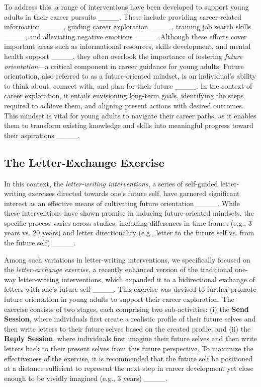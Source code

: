 To address this, a range of interventions have been developed to support young adults in their career pursuits ____. These include providing career-related information ____, guiding career exploration ____, training job search skills ____, and alleviating negative emotions ____. Although these efforts cover important areas such as informational resources, skills development, and mental health support ____, they often overlook the importance of fostering \textit{future orientation}—a critical component in career guidance for young adults. Future orientation, also referred to as a future-oriented mindset, is an individual's ability to think about, connect with, and plan for their future ____. In the context of career exploration, it entails envisioning long-term goals, identifying the steps required to achieve them, and aligning present actions with desired outcomes. This mindset is vital for young adults to navigate their career paths, as it enables them to transform existing knowledge and skills into meaningful progress toward their aspirations ____.

\subsection{The Letter-Exchange Exercise}
In this context, the \textit{letter-writing interventions}, a series of self-guided letter-writing exercises directed towards one's future self, have garnered significant interest as an effective means of cultivating future orientation ____. While these interventions have shown promise in inducing future-oriented mindsets, the specific process varies across studies, including differences in time frames (e.g., 3 years vs. 20 years) and letter directionality (e.g., letter to the future self vs. from the future self) ____. 

Among such variations in letter-writing interventions, we specifically focused on the \textit{letter-exchange exercise}, a recently enhanced version of the traditional one-way letter-writing interventions, which expanded it to a bidirectional exchange of letters with one's future self ____. This exercise was devised to further promote future orientation in young adults to support their career exploration. The exercise consists of two stages, each comprising two sub-activities: (i) the \textbf{Send Session}, where individuals first create a realistic profile of their future selves and then write letters to their future selves based on the created profile, and (ii) the \textbf{Reply Session}, where individuals first imagine their future selves and then write letters back to their present selves from this future perspective. To maximize the effectiveness of the exercise, it is recommended that the future self be positioned at a distance sufficient to represent the next step in career development yet close enough to be vividly imagined (e.g., 3 years) ____.

